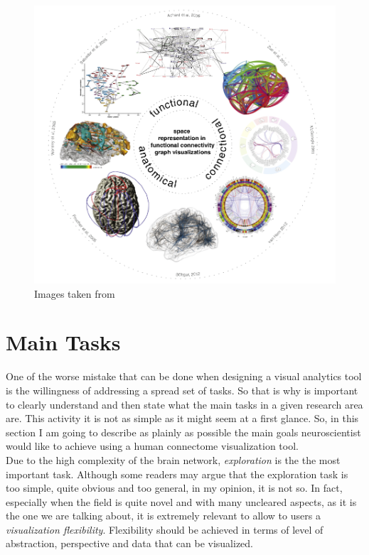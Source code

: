 \documentclass{article}
\begin{document}
\begin{multicols}{2}
\begin{figure}[ht]
\centering
\includegraphics[width = 1.8\columnwidth]{taxonomy}
\caption{Images taken from \cite{visualizingHumanConnectome}}
\label{fig:taxonomy}
\end{figure}
\section{Main Tasks}
\label{sec:mainTasks}

One of the worse mistake that can be done when designing a visual analytics tool is the willingness of addressing a spread set of tasks. So that is why is important to clearly understand and then state what the main tasks in a given research area are. This activity it is not as simple as it might seem at a first glance. So, in this section I am going to describe as plainly as possible the main goals neuroscientist would like to achieve using a human connectome visualization tool.\\

Due to the high complexity of the brain network, \textit{exploration} is the the most important task. Although some readers may argue that the exploration task is too simple, quite obvious and too general, in my opinion, it is not so. In fact, especially when the field is quite novel and with many uncleared aspects, as it is the one we are talking about, it is extremely relevant to allow to users a \textit{visualization flexibility}. Flexibility should be achieved in terms of level of abstraction, perspective and data that can be visualized. \\



\end{multicols}
\end{document}
